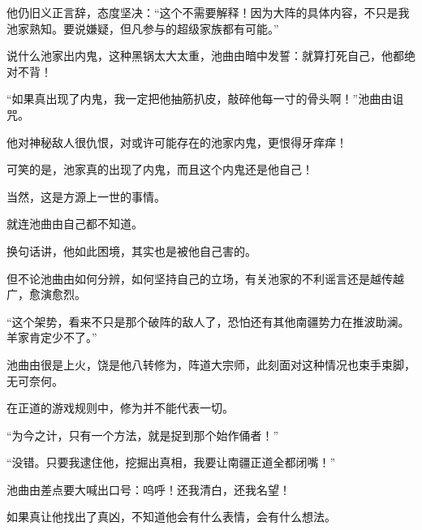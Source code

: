 \begin{this_body}
他仍旧义正言辞，态度坚决：“这个不需要解释！因为大阵的具体内容，不只是我池家熟知。要说嫌疑，但凡参与的超级家族都有可能。”

说什么池家出内鬼，这种黑锅太大太重，池曲由暗中发誓：就算打死自己，他都绝对不背！

“如果真出现了内鬼，我一定把他抽筋扒皮，敲碎他每一寸的骨头啊！”池曲由诅咒。

他对神秘敌人很仇恨，对或许可能存在的池家内鬼，更恨得牙痒痒！

可笑的是，池家真的出现了内鬼，而且这个内鬼还是他自己！

当然，这是方源上一世的事情。

就连池曲由自己都不知道。

换句话讲，他如此困境，其实也是被他自己害的。

但不论池曲由如何分辨，如何坚持自己的立场，有关池家的不利谣言还是越传越广，愈演愈烈。

“这个架势，看来不只是那个破阵的敌人了，恐怕还有其他南疆势力在推波助澜。羊家肯定少不了。”

池曲由很是上火，饶是他八转修为，阵道大宗师，此刻面对这种情况也束手束脚，无可奈何。

在正道的游戏规则中，修为并不能代表一切。

“为今之计，只有一个方法，就是捉到那个始作俑者！”

“没错。只要我逮住他，挖掘出真相，我要让南疆正道全都闭嘴！”

池曲由差点要大喊出口号：呜呼！还我清白，还我名望！

如果真让他找出了真凶，不知道他会有什么表情，会有什么想法。

\end{this_body}

